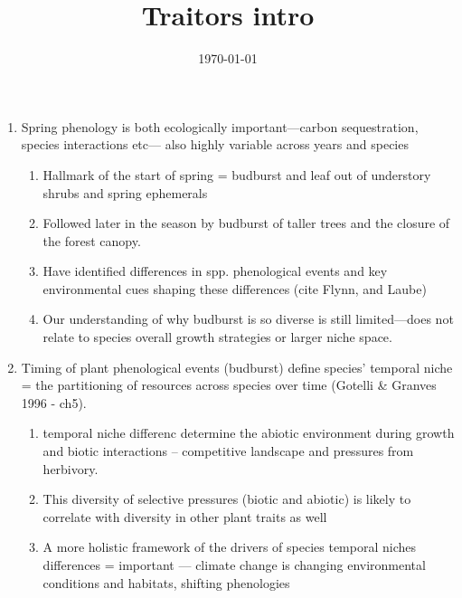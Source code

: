 \documentclass{article}
\begin{document}
\title{Traitors intro}
\date{\today}

\maketitle 

\begin{enumerate}

\item Spring phenology is both ecologically important---carbon sequestration, species interactions etc--- also highly variable across years and species
\begin{enumerate}
\item Hallmark of the start of spring = budburst and leaf out of understory shrubs and spring ephemerals
\item Followed later in the season by budburst of taller trees and the closure of the forest canopy.
\item Have identified differences in spp. phenological events and key environmental cues shaping these differences (cite Flynn, and Laube)
\item Our understanding of why budburst is so diverse is still limited---does not relate to species overall growth strategies or larger niche space.
\end{enumerate} 

\item Timing of plant phenological events (budburst) define species' temporal niche = the partitioning of resources across species over time (Gotelli \& Granves 1996 - ch5).
\begin{enumerate}
\item temporal niche differenc determine the abiotic environment during growth and biotic interactions -- competitive landscape and pressures from herbivory.
\item This diversity of selective pressures (biotic and abiotic) is likely to correlate with diversity in other plant traits as well
\item A more holistic framework of the drivers of species temporal niches differences = important --- climate change is changing environmental conditions and habitats, shifting phenologies
\end{enumerate}



\end{enumerate}
\end{document}

